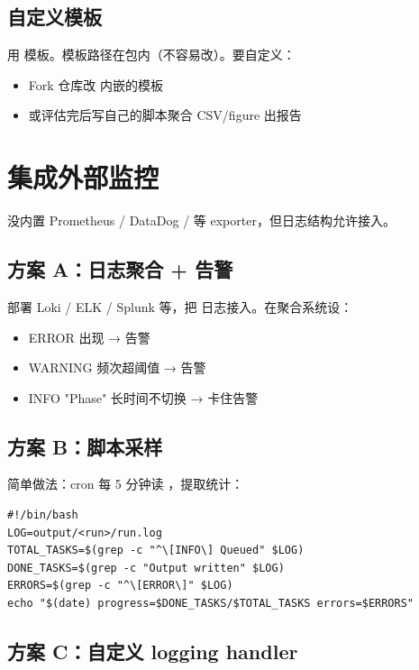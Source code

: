 \subsection{自定义模板}

 用  模板。模板路径在包内（不容易改）。要自定义：

\begin{itemize}
  \item Fork 仓库改  内嵌的模板
  \item 或评估完后写自己的脚本聚合 CSV/figure 出报告
\end{itemize}

\section{集成外部监控}

\openbench{} 没内置 Prometheus / DataDog / 等 exporter，但日志结构允许接入。

\subsection{方案 A：日志聚合 + 告警}

部署 Loki / ELK / Splunk 等，把 \openbench{} 日志接入。在聚合系统设：

\begin{itemize}
  \item ERROR 出现 → 告警
  \item WARNING 频次超阈值 → 告警
  \item INFO "Phase" 长时间不切换 → 卡住告警
\end{itemize}

\subsection{方案 B：脚本采样}

简单做法：cron 每 5 分钟读 ，提取统计：

\begin{verbatim}
#!/bin/bash
LOG=output/<run>/run.log
TOTAL_TASKS=$(grep -c "^\[INFO\] Queued" $LOG)
DONE_TASKS=$(grep -c "Output written" $LOG)
ERRORS=$(grep -c "^\[ERROR\]" $LOG)
echo "$(date) progress=$DONE_TASKS/$TOTAL_TASKS errors=$ERRORS"
\end{verbatim}

\subsection{方案 C：自定义 logging handler}

